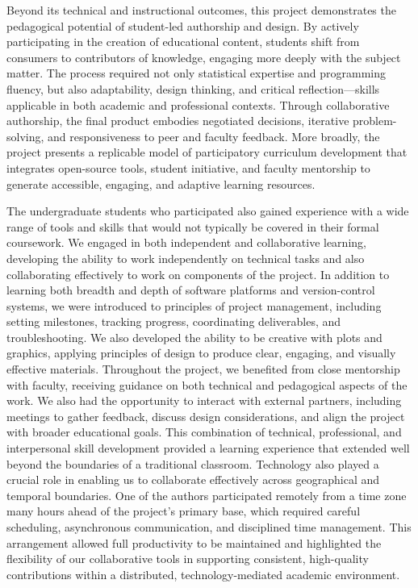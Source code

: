 \documentclass[11pt]{article}
\begin{document}
Beyond its technical and instructional outcomes, this project demonstrates the pedagogical potential of student-led authorship and design. By actively participating in the creation of educational content, students shift from consumers to contributors of knowledge, engaging more deeply with the subject matter.
The process required not only statistical expertise and programming fluency, but also adaptability, design thinking, and critical reflection—skills applicable in both academic and professional contexts. Through collaborative authorship, the final product embodies negotiated decisions, iterative problem-solving, and responsiveness to peer and faculty feedback.
More broadly, the project presents a replicable model of participatory curriculum development that integrates open-source tools, student initiative, and faculty mentorship to generate accessible, engaging, and adaptive learning resources.

The undergraduate students who participated also gained experience with a wide range of tools and skills that would not typically be covered in their formal coursework.
We engaged in both independent and collaborative learning, developing the ability to work independently on technical tasks and also collaborating effectively to work on components of the project.
In addition to learning both breadth and depth of software platforms and version-control systems, we were introduced to principles of project management, including setting milestones, tracking progress, coordinating deliverables, and troubleshooting.
We also developed the ability to be creative with plots and graphics, applying principles of design to produce clear, engaging, and visually effective materials.
Throughout the project, we benefited from close mentorship with faculty, receiving guidance on both technical and pedagogical aspects of the work.
We also had the opportunity to interact with external partners, including meetings to gather feedback, discuss design considerations, and align the project with broader educational goals.
This combination of technical, professional, and interpersonal skill development provided a learning experience that extended well beyond the boundaries of a traditional classroom. Technology also played a crucial role in enabling us to collaborate effectively across geographical and temporal boundaries. One of the authors participated remotely from a time zone many hours ahead of the project’s primary base, which required careful scheduling, asynchronous communication, and disciplined time management. This arrangement allowed full productivity to be maintained and highlighted the flexibility of our collaborative tools in supporting consistent, high-quality contributions within a distributed, technology-mediated academic environment.
\end{document}
